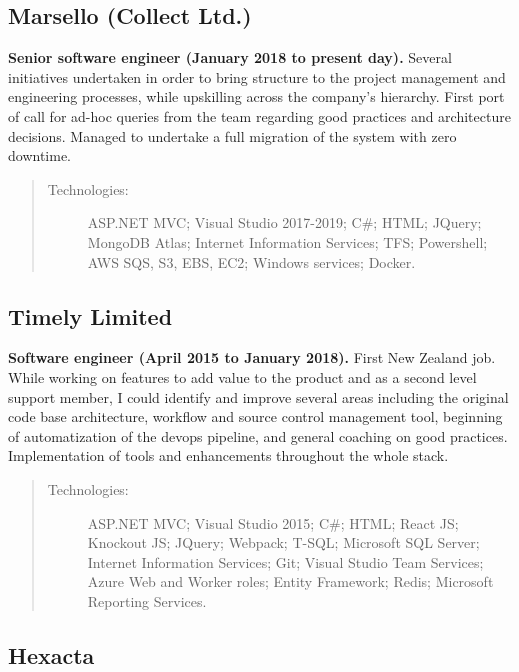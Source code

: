 \subsection*{Marsello (Collect Ltd.)}

\textbf{Senior software engineer (January 2018 to present day).} Several initiatives undertaken in order to bring structure to the project management and engineering processes, while upskilling across the company's hierarchy. First port of call for ad-hoc queries from the team regarding good practices and architecture decisions. Managed to undertake a full migration of the system with zero downtime.

\begin{quote}
\begin{description}
    \item[Technologies:] ASP.NET MVC; Visual Studio 2017-2019; C\#; HTML; JQuery; MongoDB Atlas; Internet Information Services; TFS; Powershell; AWS SQS, S3, EBS, EC2; Windows services; Docker.
\end{description}
\end{quote}

\subsection*{Timely Limited}

\textbf{Software engineer (April 2015 to January 2018).} First New Zealand job. While working on features to add value to the product and as a second level support member, I could identify and improve several areas including the original code base architecture, workflow and source control management tool, beginning of automatization of the devops pipeline, and general coaching on good practices. Implementation of tools and enhancements throughout the whole stack.

\begin{quote}
\begin{description}
    \item[Technologies:] ASP.NET MVC; Visual Studio 2015; C\#; HTML; React JS; Knockout JS; JQuery; Webpack; T-SQL; Microsoft SQL Server; Internet Information Services; Git; Visual Studio Team Services; Azure Web and Worker roles; Entity Framework; Redis; Microsoft Reporting Services.
\end{description}
\end{quote}

\subsection*{Hexacta}

